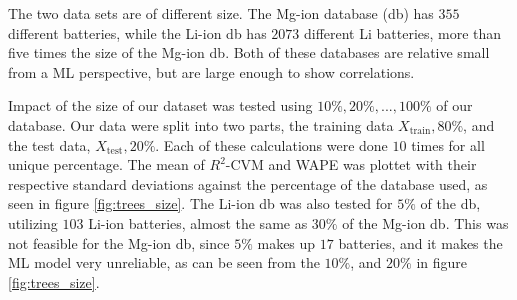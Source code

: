 The two data sets are of different size. The Mg-ion database (\ac{db}) has $355$ different batteries, while the Li-ion db has $2073$ different Li batteries, more than five times the size of the Mg-ion db. Both of these databases are relative small from a ML perspective, but are large enough to show correlations. 

Impact of the size of our dataset was tested using $10\%,20\%,...,100\%$ of our database. Our data were split into two parts, the training data $X_{\text{train}}, 80\%$, and the test data, $X_{\text{test}},20\%$. Each of these calculations were done $10$ times for all unique percentage. The mean of $R^2$-CVM and WAPE was plottet with their respective standard deviations against the percentage of the database used, as seen in figure \ref{fig:trees_size}. The Li-ion db was also tested for $5\%$ of the db, utilizing $103$ Li-ion batteries, almost the same as $30\%$ of the Mg-ion db. This was not feasible for the Mg-ion db, since $5\%$ makes up $17$ batteries, and it makes the ML model very unreliable, as can be seen from the $10\%$, and $20\%$ in figure \ref{fig:trees_size}.


